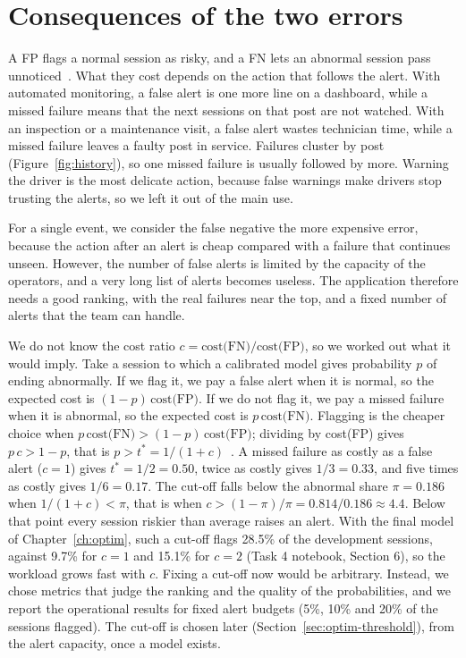 \documentclass[12pt,a4paper,openany]{report}
\begin{document}
\section{Consequences of the two errors}\label{sec:errors}

A \ac{FP} flags a normal session as risky, and a \ac{FN} lets an abnormal session pass unnoticed~\cite{mindd04}. What they cost
depends on the action that follows the alert. With automated monitoring, a false alert is one more line on a
dashboard, while a missed failure means that the next sessions on that post are not watched. With an inspection or
a maintenance visit, a false alert wastes technician time, while a missed failure leaves a faulty post in service.
Failures cluster by post (Figure~\ref{fig:history}), so one missed failure is usually followed by more. Warning the
driver is the most delicate action, because false warnings make drivers stop trusting the alerts, so we left it
out of the main use.

For a single event, we consider the false negative the more expensive error, because the action after an alert is
cheap compared with a failure that continues unseen. However, the number of false alerts is limited by the
capacity of the operators, and a very long list of alerts becomes useless. The application therefore needs a good
ranking, with the real failures near the top, and a fixed number of alerts that the team can handle.

We do not know the cost ratio $c = \text{cost(FN)}/\text{cost(FP)}$, so we worked out what it would imply. Take a
session to which a calibrated model gives probability $p$ of ending abnormally. If we flag it, we pay a false alert
when it is normal, so the expected cost is $(1-p)\,\text{cost(FP)}$. If we do not flag it, we pay a missed failure
when it is abnormal, so the expected cost is $p\,\text{cost(FN)}$. Flagging is the cheaper choice when
$p\,\text{cost(FN)} > (1-p)\,\text{cost(FP)}$; dividing by cost(FP) gives $p\,c > 1-p$, that is
$p > t^{*} = 1/(1+c)$~\cite{mindd_lab_eval}. A missed failure as costly as a false alert ($c=1$) gives $t^{*}=1/2=0.50$,
twice as costly gives $1/3=0.33$, and five times as costly gives $1/6=0.17$. The cut-off falls below the abnormal
share $\pi = 0.186$ when $1/(1+c) < \pi$, that is when $c > (1-\pi)/\pi = 0.814/0.186 \approx 4.4$. Below that point
every session riskier than average raises an alert. With the final model of Chapter~\ref{ch:optim}, such a cut-off
flags 28.5\% of the development sessions, against 9.7\% for $c=1$ and 15.1\% for $c=2$ (Task 4 notebook, Section 6),
so the workload grows fast with $c$. Fixing a cut-off now would be arbitrary. Instead, we chose metrics that judge
the ranking and the quality of the probabilities, and we report the operational results for fixed alert budgets
(5\%, 10\% and 20\% of the sessions flagged). The cut-off is chosen later (Section~\ref{sec:optim-threshold}), from
the alert capacity, once a model exists.
\end{document}
